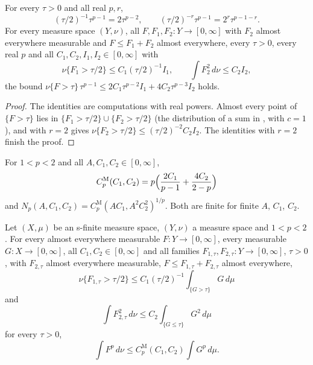 \begin{lemma}
\label{lem:marcinkiewicz-level}
\leanok
{}
For every $\tau > 0$ and all real $p, r$,
\[
  (\tau/2)^{-1} \tau^{p-1} = 2 \tau^{p-2} , \qquad
  (\tau/2)^{-r} \tau^{p-1} = 2^r \tau^{p-1-r} .
\]
For every measure space $(Y, \nu)$, all $F, F_1, F_2 : Y \to [0, \infty]$ with $F_2$ almost
everywhere measurable and $F \leq F_1 + F_2$ almost everywhere, every $\tau > 0$, every real
$p$ and all $C_1, C_2, I_1, I_2 \in [0, \infty]$ with
\[
  \nu\{F_1 > \tau/2\} \leq C_1 (\tau/2)^{-1} I_1 , \qquad \int F_2^2 \, d\nu \leq C_2 I_2 ,
\]
the bound
$\nu\{F > \tau\} \, \tau^{p-1} \leq 2 C_1 \tau^{p-2} I_1 + 4 C_2 \tau^{p-3} I_2$ holds.
\end{lemma}

\begin{proof}
\leanok
{}
The identities are computations with real powers. Almost every point of $\{F > \tau\}$ lies in
$\{F_1 > \tau/2\} \cup \{F_2 > \tau/2\}$ (the distribution of a sum in
, with $c = 1$), and  with
$r = 2$ gives $\nu\{F_2 > \tau/2\} \leq (\tau/2)^{-2} C_2 I_2$. The identities with $r = 2$
finish the proof.
\end{proof}

\begin{definition}
\label{def:marcinkiewicz-const}
\leanok
For $1 < p < 2$ and all $A, C_1, C_2 \in [0, \infty]$,
\[
  C^{\mathrm M}_p(C_1, C_2) = p \Bigl( \frac{2 C_1}{p - 1} + \frac{4 C_2}{2 - p} \Bigr)
\]
and $N_p(A, C_1, C_2) = C^{\mathrm M}_p(A C_1, A^2 C_2^2)^{1/p}$. Both are finite for finite
$A$, $C_1$, $C_2$.
\end{definition}

\begin{theorem}
\label{thm:marcinkiewicz-layer-cake}
\leanok
{}
Let $(X, \mu)$ be an s-finite measure space, $(Y, \nu)$ a measure space and $1 < p < 2$. For
every almost everywhere measurable $F : Y \to [0, \infty]$, every measurable
$G : X \to [0, \infty]$, all $C_1, C_2 \in [0, \infty]$ and all families
$F_{1, \tau}, F_{2, \tau} : Y \to [0, \infty]$, $\tau > 0$, with $F_{2, \tau}$ almost everywhere
measurable, $F \leq F_{1, \tau} + F_{2, \tau}$ almost everywhere,
\[
  \nu\{F_{1, \tau} > \tau/2\} \leq C_1 (\tau/2)^{-1} \int_{\{G > \tau\}} G \, d\mu
\]
and
\[
  \int F_{2, \tau}^2 \, d\nu \leq C_2 \int_{\{G \leq \tau\}} G^2 \, d\mu
\]
for every $\tau > 0$,
\[
  \int F^p \, d\nu \leq C^{\mathrm M}_p(C_1, C_2) \int G^p \, d\mu .
\]
\end{theorem}

